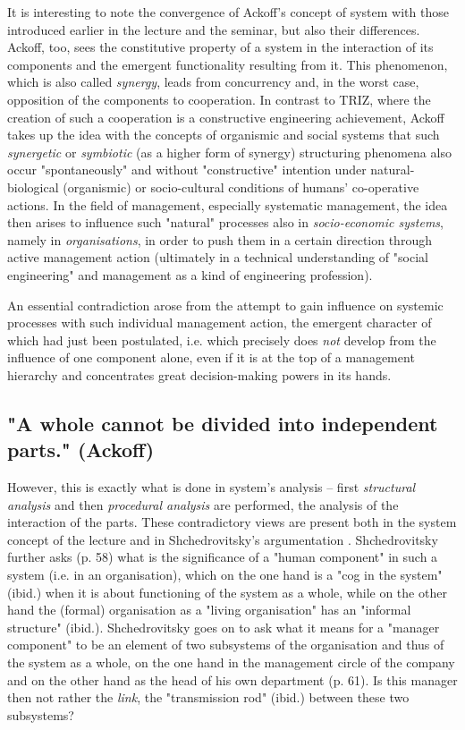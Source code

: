 \documentclass[11pt,a4paper]{article}
\begin{document}
It is interesting to note the convergence of Ackoff's concept of system with
those introduced earlier in the lecture and the seminar, but also their
differences. Ackoff, too, sees the constitutive property of a system in the
interaction of its components and the emergent functionality resulting from
it. This phenomenon, which is also called \emph{synergy}, leads from
concurrency and, in the worst case, opposition of the components to
cooperation. In contrast to TRIZ, where the creation of such a cooperation is
a constructive engineering achievement, Ackoff takes up the idea with the
concepts of organismic and social systems that such \emph{synergetic} or
\emph{symbiotic} (as a higher form of synergy) structuring phenomena also
occur "spontaneously" and without "constructive" intention under
natural-biological (organismic) or socio-cultural conditions of humans'
co-operative actions. In the field of management, especially systematic
management, the idea then arises to influence such "natural" processes also in
\emph{socio-economic systems}, namely in \emph{organisations}, in order to
push them in a certain direction through active management action (ultimately
in a technical understanding of "social engineering" and management as a kind
of engineering profession).

An essential contradiction arose from the attempt to gain influence on
systemic processes with such individual management action, the emergent
character of which had just been postulated, i.e. which precisely does
\emph{not} develop from the influence of one component alone, even if it is at
the top of a management hierarchy and concentrates great decision-making
powers in its hands.

\subsection{"A whole cannot be divided into independent parts." (Ackoff)}

However, this is exactly what is done in system's analysis -- first
\emph{structural analysis} and then \emph{procedural analysis} are performed,
the analysis of the interaction of the parts. These contradictory views are
present both in the system concept of the lecture and in Shchedrovitsky's
argumentation \cite[p. 61 cont.]{MSM}. Shchedrovitsky further asks (p. 58)
what is the significance of a "human component" in such a system (i.e. in an
organisation), which on the one hand is a "cog in the system" (ibid.) when it
is about functioning of the system as a whole, while on the other hand the
(formal) organisation as a "living organisation" has an "informal structure"
(ibid.). Shchedrovitsky goes on to ask what it means for a "manager component"
to be an element of two subsystems of the organisation and thus of the system
as a whole, on the one hand in the management circle of the company and on the
other hand as the head of his own department (p. 61). Is this manager then not
rather the \emph{link}, the "transmission rod" (ibid.) between these two
subsystems?
\end{document}
